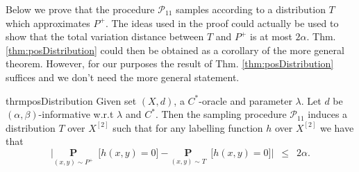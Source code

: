 \documentclass[12pt]{article}
\newcommand{\mb}{\mathbf}
\newcommand{\mc}{\mathcal}
\begin{document}
Below we prove that the procedure $\mc P_{11}$ samples according to a distribution $T$ which approximates $P^+$. The ideas used in the proof could actually be used to show that the total variation distance between $T$ and $P^+$ is at most $2\alpha$. Thm. \ref{thm:posDistribution} could then be obtained as a corollary of the more general theorem. However, for our purposes the result of Thm. \ref{thm:posDistribution} suffices and we don't need the more general statement. 

\begin{restatable}{thrm}{posDistribution}
\label{thm:posDistribution}
Given set $(X, d)$, a $C^*$-oracle and parameter $\lambda$. Let $d$ be $(\alpha, \beta)$-informative w.r.t $\lambda$ and $C^*$.  Then the sampling procedure $\mc P_{11}$ induces a distribution $T$ over $X^{[2]}$ such that for any labelling function $h$ over $X^{[2]}$ we have that $$\Big|\underset{(x, y) \sim P^+}{\mb P}\enspace \big[ h(x, y) = 0 ] - \underset{(x, y) \sim T}{\mb P}\enspace \big[ h(x, y) = 0 ]\Big|  \enspace \le \enspace 2\alpha.$$ 
\end{restatable}
\end{document}

